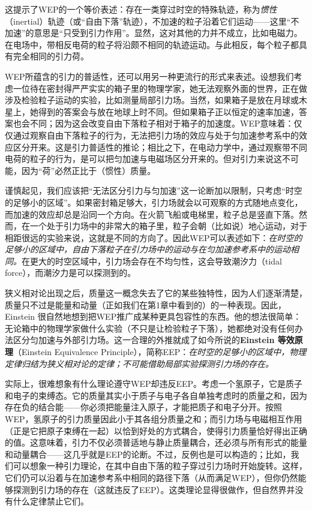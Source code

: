 这提示了WEP的一个等价表述：存在一类穿过时空的特殊轨迹，称为\emph{惯性}（inertial）轨迹（或“自由下落”轨迹），不加速的粒子沿着它们运动——这里“不加速”的意思是“只受到引力作用”。显然，这对其他的力并不成立，比如电磁力。在电场中，带相反电荷的粒子将沿颇不相同的轨迹运动。与此相反，每个粒子都具有完全相同的引力荷。

WEP所蕴含的引力的普适性，还可以用另一种更流行的形式来表述。设想我们考虑一位待在密封得严严实实的箱子里的物理学家，她无法观察外面的世界，正在做涉及检验粒子运动的实验，比如测量局部引力场。当然，如果箱子是放在月球或木星上，她得到的答案会与放在地球上时不同。但如果箱子正以恒定的速率加速，答案也会不同；因为这会改变自由下落粒子相对于箱子的加速度。WEP意味着：仅仅通过观察自由下落粒子的行为，无法把引力场的效应与处于匀加速参考系中的效应区分开来。这是引力普适性的推论；相比之下，在电动力学中，通过观察带不同电荷的粒子的行为，是可以把匀加速与电磁场区分开来的。但对引力来说这不可能，因为“荷”必然正比于（惯性）质量。

谨慎起见，我们应该把“无法区分引力与匀加速”这一论断加以限制，只考虑“时空的足够小的区域”。如果密封箱足够大，引力场就会以可观察的方式随地点变化，而加速的效应却总是沿同一个方向。在火箭飞船或电梯里，粒子总是竖直下落。然而，在一个处于引力场中的非常大的箱子里，粒子会朝（比如说）地心运动，对于相距很远的实验来说，这就是不同的方向了。因此WEP可以表述如下：\emph{在时空的足够小的区域中，自由下落粒子在引力场中的运动与在匀加速参考系中的运动相同。}在更大的时空区域中，引力场会存在不均匀性，这会导致潮汐力（tidal force），而潮汐力是可以探测到的。

狭义相对论出现之后，质量这一概念失去了它的某些独特性，因为人们逐渐清楚，质量只不过是能量和动量（正如我们在第1章中看到的）的一种表现。因此，Einstein 很自然地想到把WEP推广成某种更具包容性的东西。他的想法很简单：无论箱中的物理学家做什么实验（不只是让检验粒子下落），她都绝对没有任何办法区分匀加速与外部引力场。这一合理的外推就成了如今所说的\textbf{Einstein 等效原理}（Einstein Equivalence Principle），简称EEP：\emph{在时空的足够小的区域中，物理定律归结为狭义相对论的定律；不可能借助局部实验探测引力场的存在。}

实际上，很难想象有什么理论遵守WEP却违反EEP。考虑一个氢原子，它是质子和电子的束缚态。它的质量其实小于质子与电子各自单独考虑时的质量之和，因为存在负的结合能——你必须把能量注入原子，才能把质子和电子分开。按照WEP，氢原子的引力质量因此小于其各组分质量之和；而引力场与电磁相互作用（正是它把原子束缚在一起）以恰到好处的方式耦合，使得引力质量恰好得出正确的值。这意味着，引力不仅必须普适地与静止质量耦合，还必须与所有形式的能量和动量耦合——这几乎就是EEP的论断。不过，反例也是可以构造的；比如，我们可以想象一种引力理论，在其中自由下落的粒子穿过引力场时开始旋转。这样，它们仍可以沿着与在加速参考系中相同的路径下落（从而满足WEP），但你仍然能够探测到引力场的存在（这就违反了EEP）。这类理论显得很做作，但自然界并没有什么定律禁止它们。

